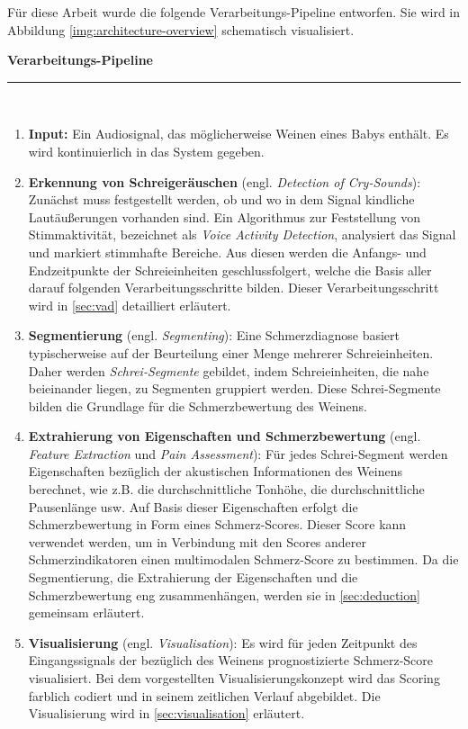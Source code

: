 Für diese Arbeit wurde die folgende Verarbeitungs-Pipeline entworfen. Sie wird in Abbildung \autoref{img:architecture-overview} schematisch visualisiert. 
\vspace{4mm}

\noindent\textbf{Verarbeitungs-Pipeline}\noindent\rule{0.7\linewidth}{0.3pt} \\[-3mm]
\begin{enumerate}[leftmargin=*]
	\item \textbf{Input: } Ein Audiosignal, das möglicherweise Weinen eines Babys enthält. Es wird kontinuierlich in das System gegeben.
	
	\item \textbf{Erkennung von Schreigeräuschen} (engl. \emph{Detection of Cry-Sounds}): Zunächst muss festgestellt werden, ob und wo in dem Signal kindliche Lautäußerungen vorhanden sind. Ein Algorithmus zur Feststellung von Stimmaktivität, bezeichnet als \emph{Voice Activity Detection}, analysiert das Signal und markiert stimmhafte Bereiche. Aus diesen werden die Anfangs- und Endzeitpunkte der Schreieinheiten geschlussfolgert, welche die Basis aller darauf folgenden Verarbeitungsschritte bilden. Dieser Verarbeitungsschritt wird in \autoref{sec:vad} detailliert erläutert.
	
	\item \textbf{Segmentierung} (engl. \emph{Segmenting}): Eine Schmerzdiagnose basiert typischerweise auf der Beurteilung einer Menge mehrerer Schreieinheiten. Daher werden \emph{Schrei-Segmente} gebildet, indem Schreieinheiten, die nahe beieinander liegen, zu Segmenten gruppiert werden. Diese Schrei-Segmente bilden die Grundlage für die Schmerzbewertung des Weinens. 
		
	\item \textbf{Extrahierung von Eigenschaften und Schmerzbewertung} (engl. \emph{Feature Extraction} und \emph{Pain Assessment}): Für jedes Schrei-Segment werden Eigenschaften bezüglich der akustischen Informationen des Weinens berechnet, wie z.B. die durchschnittliche Tonhöhe, die durchschnittliche Pausenlänge usw. Auf Basis dieser Eigenschaften erfolgt die Schmerzbewertung in Form eines Schmerz-Scores. Dieser Score kann verwendet werden, um in Verbindung mit den Scores anderer Schmerzindikatoren einen multimodalen Schmerz-Score zu bestimmen. Da die Segmentierung, die Extrahierung der Eigenschaften und die Schmerzbewertung eng zusammenhängen, werden sie in \autoref{sec:deduction} gemeinsam erläutert.
	
	\item \textbf{Visualisierung} (engl. \emph{Visualisation}): Es wird für jeden Zeitpunkt des Eingangssignals der bezüglich des Weinens prognostizierte Schmerz-Score visualisiert. Bei dem vorgestellten Visualisierungskonzept wird das Scoring farblich codiert und in seinem zeitlichen Verlauf abgebildet. Die Visualisierung wird in \autoref{sec:visualisation} erläutert.	
	\end{enumerate}
	

